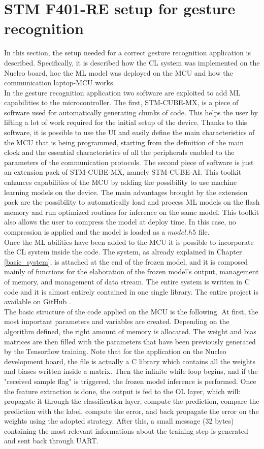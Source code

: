\documentclass[12pt]{report}
\begin{document}
\section{STM F401-RE setup for gesture recognition}
In this section, the setup needed for a correct gesture recognition application is described. Specifically, it is described how the CL system was implemented on the Nucleo board, hoe the ML model was deployed on the MCU and how the communication laptop-MCU works.\\
In the gesture recognition application two software are exploited to add ML capabilities to the microcontroller. The first, STM-CUBE-MX, is a piece of software used for automatically generating chunks of code. This helps the user by lifting a lot of work required for the initial setup of the device. Thanks to this software, it is possible to use the UI and easily define the main characteristics of the MCU that is being programmed, starting from the definition of the main clock and the essential characteristics of all the peripherals enabled to the parameters of the communication protocols. The second piece of software is just an extension pack of STM-CUBE-MX, namely STM-CUBE-AI. This toolkit enhances capabilities of the MCU by adding the possibility to use machine learning models on the device. The main advantages brought by the extension pack are the possibility to automatically load and process ML models on the flash memory and run optimized routines for inference on the same model. This toolkit also allows the user to compress the model at deploy time. In this case, no compression is applied and the model is loaded as a $model.h5$ file.\\
Once the ML abilities have been added to the MCU it is possible to incorporate the CL system inside the code. The system, as already explained in Chapter \ref{basic_system}, is attached at the end of the frozen model, and it is composed mainly of functions for the elaboration of the frozen model's output, management of memory, and management of data stream. The entire system is written in C code and it is almost entirely contained in one single library. The entire project is available on GitHub \autocite{github_repo}.\\
The basic structure of the code applied on the MCU is the following. At first, the most important parameters and variables are created. Depending on the algorithm defined, the right amount of memory is allocated. The weight and bias matrices are then filled with the parameters that have been previously generated by the Tensorflow training. Note that for the application on the Nucleo development board, the file is actually a C library which contains all the weights and biases written inside a matrix. Then the infinite while loop begins, and if the "received sample flag" is triggered, the frozen model inference is performed. Once the feature extraction is done, the output is fed to the OL layer, which will: propagate it through the classification layer, compute the prediction, compare the prediction with the label, compute the error, and back propagate the error on the weights using the adopted strategy. After this, a small message (32 bytes) containing the most relevant informations about the training step is generated and sent back through UART.\\
\end{document}

